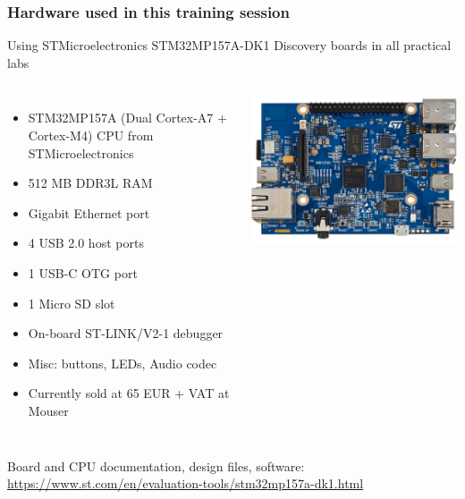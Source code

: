 \begin{frame}
\frametitle{Hardware used in this training session}
  Using STMicroelectronics STM32MP157A-DK1 Discovery boards in all practical labs
  \begin{columns}
    {\footnotesize
    \begin{itemize}
    \item STM32MP157A (Dual Cortex-A7 + Cortex-M4) CPU from STMicroelectronics
    \item 512 MB DDR3L RAM
    \item Gigabit Ethernet port
    \item 4 USB 2.0 host ports
    \item 1 USB-C OTG port
    \item 1 Micro SD slot
    \item On-board ST-LINK/V2-1 debugger
    \item Misc: buttons, LEDs, Audio codec
    \item Currently sold at 65 EUR + VAT at Mouser
    \end{itemize}
    }
    \includegraphics[width=\textwidth]{slides/discovery-board/discovery-board.png}
  \end{columns}
  \vspace{1em}
  {\small
  Board and CPU documentation, design files, software:
  \url{https://www.st.com/en/evaluation-tools/stm32mp157a-dk1.html}
  }
\end{frame}
